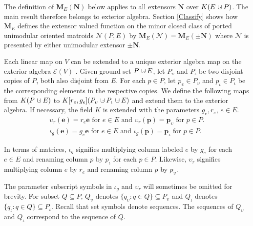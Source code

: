 \documentclass[12pt]{article}
\theoremstyle{definition}
\newtheorem{definition}[theorem]{Definition}
\newcommand{\dunion}
{\mbox{\hbox{\hskip6pt$\cdot$\hskip-5.50pt$\cup$\hskip2pt}}}
\newcommand{\epsilonfun}{\ensuremath{\epsilon}}
\newcommand{\Is}{\ensuremath{\iota}}
\newcommand{\Vs}{\ensuremath{\upsilon}}
\newcommand{\FieldK}{\ensuremath{K}}
\newcommand{\ext}[1]{\ensuremath{\mathbf{#1}}}
\begin{document}
The definition of $\ext{M}_E(\ext{N})$ below applies to all
extensors $\ext{N}$ over $\FieldK (E\dunion P)$.  The main
result therefore belongs to exterior algebra.
Section \ref{Classify} shows how $\ext{M}_E$ defines the extensor valued 
function on the minor closed class of ported unimodular oriented matroids
$\mathcal{N}(P,E)$ by 
$\ext{M}_E(\mathcal{N})=\ext{M}_E(\ext{\pm N})$ where $\mathcal{N}$
is presented by either unimodular extensor $\pm \ext{N}$.  

Each linear map on $V$ can be extended to a unique exterior algebra 
map on the exterior algebra $\mathcal{E}(V)$
\cite[Theorem 7.1]{JacobsonI}.  Given ground set $P\dunion E$, let
$P_\Vs$ and $P_\Is$ be two disjoint copies of $P$, both also
disjoint from $E$.  For each $p\in P$,
let $p_\Vs\in P_\Vs$ and $p_\Is\in P_\Is$ be the corresponding elements 
in the respective copies.  We define the following maps
from $\FieldK (P\dunion E)$ to $\FieldK[r_e,g_e] (P_\Vs\dunion P_\Is\dunion E)$
and extend them to the exterior algebra.  If necessary,
the field $\FieldK$ is extended with the parameters $g_e,r_e$,
$e\in E$.
\begin{equation}
\begin{split}
\Vs_r(\ext{e}) = r_e \ext{e} \text{ for $e\in E$ and }
\Vs_r(\ext{p}) = \ext{p}_\Vs \text{ for $p\in P$.}\\
\Is_g(\ext{e}) = g_e \ext{e} \text{ for $e\in E$ and }
\Is_g(\ext{p}) = \ext{p}_\Is \text{ for $p\in P$.}
\end{split}
\end{equation}

In terms of matrices, $\Is_g$ signifies multiplying
column labeled $e$ by $g_e$ for each $e\in E$ and renaming
column $p$ by $p_\Is$ for each $p\in P$.  Likewise, $\Vs_r$
signifies multiplying
column $e$ by $r_e$ and renaming column $p$ by $p_\Vs$.

The parameter subscript symbols in $\Is_g$ and $\Vs_r$ will sometimes be
omitted for brevity.  For subset $Q\subseteq P$, 
$Q_{\Vs}$ denotes $\{q_{\Vs} : q\in Q\}\subseteq P_{\Vs}$ and 
$Q_\Is$ denotes $\{q_{\Is} : q\in Q\}\subseteq P_{\Is}$.
Recall that set symbols denote sequences.  The sequences of
$Q_{\Vs}$ and $Q_\Is$ correspond to the sequence of $Q$.

\end{document}
